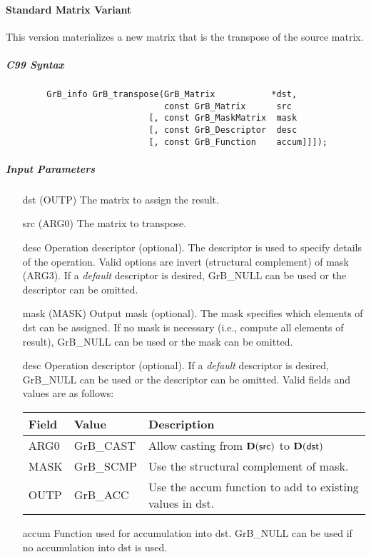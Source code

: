 \paragraph{Standard Matrix Variant}

This version materializes a new matrix that is the transpose of the source matrix.

\subparagraph{C99 Syntax}

\begin{verbatim}
        GrB_info GrB_transpose(GrB_Matrix           *dst,
                               const GrB_Matrix      src
                            [, const GrB_MaskMatrix  mask
                            [, const GrB_Descriptor  desc
                            [, const GrB_Function    accum]]]);
\end{verbatim}

\subparagraph{Input Parameters}

\begin{itemize}
    \item[{\sf dst}]   ({\sf OUTP}) The matrix to assign the result.
    \item[{\sf src}]   ({\sf ARG0}) The matrix to transpose.

    \item[{\sf desc}]  Operation descriptor (optional). The descriptor
    is used to specify details of the operation. Valid options are 
    invert (structural complement) of mask ({\sf ARG3}). If
    a \emph{default} descriptor is desired,    {\sf GrB\_NULL} can be
    used or the descriptor can be omitted.

    \item[{\sf mask}]  (MASK) Output mask (optional). The mask
    specifies which elements of {\sf dst} can be assigned.
    If no mask is necessary (i.e., compute all elements of result),
    {\sf GrB\_NULL} can be used or the mask can be omitted.

    \item[{\sf desc}]   Operation descriptor (optional). If a
    \emph{default} descriptor is desired, {\sf GrB\_NULL} can be
    used or the descriptor can be omitted.  Valid fields and values are as follows: \\
    \begin{tabular}{lll}
    Field  & Value & Description \\
    \hline
    {\sf ARG0} & {\sf GrB\_CAST} & Allow casting from $\bold{D}({\sf src})$ to $\bold{D}({\sf dst})$ \\
    {\sf MASK} & {\sf GrB\_SCMP} & Use the structural complement of {\sf mask}. \\
    {\sf OUTP}& {\sf GrB\_ACC}  & Use the {\sf accum} function to add to existing values in {\sf dst}.\\
    \end{tabular}

    \item[{\sf accum}] Function used for accumulation into dst.  {\sf GrB\_NULL}
                       can be used if no accumulation into dst is used.
\end{itemize}

